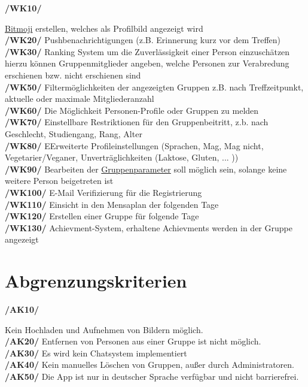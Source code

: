 \documentclass[a4paper]{scrreprt}
\begin{document}
\begin{addmargin}[25pt]{0pt} 
\hypertarget{wk10}{\textbf{/WK10/}} \hyperlink{label7}{Bitmoji} erstellen, welches als Profilbild angezeigt wird \\
\hypertarget{wk20}{\textbf{/WK20/}} Pushbenachrichtigungen (z.B. Erinnerung kurz vor dem Treffen) \\
\hypertarget{wk30}{\textbf{/WK30/}} Ranking System um die Zuverlässigkeit einer Person einzuschätzen \\ 
	hierzu können Gruppenmitglieder angeben, welche Personen zur Verabredung erschienen bzw. nicht erschienen sind\\

\hypertarget{wk50}{\textbf{/WK50/}} Filtermöglichkeiten der angezeigten Gruppen z.B. nach Treffzeitpunkt, aktuelle oder maximale Mitgliederanzahl \\
\hypertarget{wk60}{\textbf{/WK60/}} Die Möglichkeit Personen-Profile oder Gruppen zu melden\\
\hypertarget{wk70}{\textbf{/WK70/}} Einstellbare Restriktionen für den Gruppenbeitritt, z.b. nach Geschlecht, Studiengang, Rang, Alter \\
\hypertarget{wk80}{\textbf{/WK80/}} EErweiterte Profileinstellungen (Sprachen, Mag, Mag nicht, Vegetarier/Veganer, Unverträglichkeiten (Laktose, Gluten, ... ))\\
\hypertarget{wk90}{\textbf{/WK90/}} Bearbeiten der \hyperlink{label2}{Gruppenparameter} soll möglich sein, solange keine weitere Person beigetreten ist\\
\hypertarget{wk100}{\textbf{/WK100/}} E-Mail Verifizierung für die Registrierung\\
\hypertarget{wk110}{\textbf{/WK110/}} Einsicht in den Mensaplan der folgenden Tage\\
\hypertarget{wk120}{\textbf{/WK120/}} Erstellen einer Gruppe für folgende Tage\\
\hypertarget{wk130}{\textbf{/WK130/}} Achievment-System, erhaltene Achievments werden in der Gruppe angezeigt\\
\end{addmargin}
 
\section{Abgrenzungskriterien}

\begin{addmargin}[25pt]{0pt} 
\hypertarget{ak10}{\textbf{/AK10/}} Kein Hochladen und Aufnehmen von Bildern möglich.\\
\hypertarget{ak20}{\textbf{/AK20/}} Entfernen von Personen aus einer Gruppe ist nicht möglich.\\
\hypertarget{ak30}{\textbf{/AK30/}} Es wird kein Chatsystem implementiert\\
\hypertarget{ak40}{\textbf{/AK40/}} Kein manuelles Löschen von Gruppen, außer durch Administratoren.\\
\hypertarget{ak50}{\textbf{/AK50/}} Die App ist nur in deutscher Sprache verfügbar und nicht barrierefrei. \\
\end{addmargin}
\end{document}
